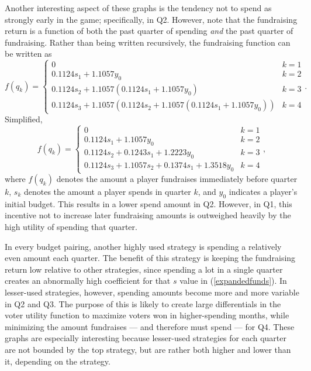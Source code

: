 \documentclass[11pt]{article}
\begin{document}
Another interesting aspect of these graphs is the tendency not to spend as strongly early in the game; specifically, in Q2. However, note that the fundraising return is a function of both the past quarter of spending \textit{and} the past quarter of fundraising. Rather than being written recursively, the fundraising function can be written as 
\begin{equation}
f(q_k) = \begin{cases}
0 & k=1 \\
0.1124s_1 + 1.1057y_0 & k=2 \\
0.1124s_2 + 1.1057(0.1124s_1 + 1.1057y_0) & k=3 \\
0.1124s_3 + 1.1057(0.1124s_2 + 1.1057(0.1124s_1 + 1.1057y_0)) & k=4
\end{cases}.
\end{equation}
Simplified,
\begin{equation}
\label{expandedfunds}
f(q_k) = \begin{cases}
0 & k=1 \\
0.1124s_1 + 1.1057y_0 & k=2 \\
0.1124s_2 + 0.1243s_1 + 1.2223y_0 & k=3 \\
0.1124s_3 + 1.1057s_2 + 0.1374s_1 + 1.3518y_0 & k=4
\end{cases},
\end{equation}
where $f(q_k)$ denotes the amount a player fundraises immediately before quarter $k$, $s_k$ denotes the amount a player spends in quarter $k$, and $y_0$ indicates a player's initial budget. This results in a lower spend amount in Q2. However, in Q1, this incentive not to increase later fundraising amounts is outweighed heavily by the high utility of spending that quarter. 

In every budget pairing, another highly used strategy is spending a relatively even amount each quarter. The benefit of this strategy is keeping the fundraising return low relative to other strategies, since spending a lot in a single quarter creates an abnormally high coefficient for that $s$ value in (\ref{expandedfunds}). In lesser-used strategies, however, spending amounts become more and more variable in Q2 and Q3. The purpose of this is likely to create large differentials in the voter utility function to maximize voters won in higher-spending months, while minimizing the amount fundraises --- and therefore must spend --- for Q4. These graphs are especially interesting because lesser-used strategies for each quarter are not bounded by the top strategy, but are rather both higher and lower than it, depending on the strategy.
\end{document}
